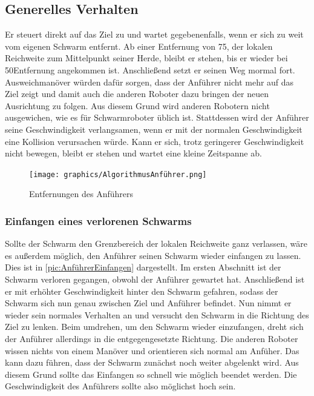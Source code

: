 \subsection*{Generelles Verhalten}

Er steuert direkt auf das Ziel zu und wartet gegebenenfalls, wenn er sich zu weit vom eigenen Schwarm entfernt. Ab einer Entfernung von 75\per, der lokalen Reichweite zum Mittelpunkt seiner Herde, bleibt er stehen, bis er wieder bei 50\per Entfernung angekommen ist. Anschließend setzt er seinen Weg mormal fort. Ausweichmanöver würden dafür sorgen, dass der Anführer nicht mehr auf das Ziel zeigt und damit auch die anderen Roboter dazu bringen der neuen Ausrichtung zu folgen. Aus diesem Grund wird anderen Robotern nicht ausgewichen, wie es für Schwarmroboter üblich ist. Stattdessen wird der Anführer seine Geschwindigkeit verlangsamen, wenn er mit der normalen Geschwindigkeit eine Kollision verursachen würde. Kann er sich, trotz geringerer Geschwindigkeit nicht bewegen, bleibt er stehen und wartet eine kleine Zeitspanne ab.

\begin{figure}
	\texttt{[image: graphics/AlgorithmusAnführer.png]}
	\caption{Entfernungen des Anführers}
	\label{pic:AnführerReichweiten}
\end{figure}

\subsubsection*{Einfangen eines verlorenen Schwarms}\label{subsubsec:AnführerEinfangen}
Sollte der Schwarm den Grenzbereich der lokalen Reichweite ganz verlassen, wäre es außerdem möglich, den Anführer seinen Schwarm wieder einfangen zu lassen. Dies ist in \autoref{pic:AnführerEinfangen} dargestellt.
Im ersten Abschnitt ist der Schwarm verloren gegangen, obwohl der Anführer gewartet hat. Anschließend ist er mit erhöhter Geschwindigkeit hinter den Schwarm gefahren, sodass der Schwarm sich nun genau zwischen Ziel und Anführer befindet. Nun nimmt er wieder sein normales Verhalten an und versucht den Schwarm in die Richtung des Ziel zu lenken. Beim umdrehen, um den Schwarm wieder einzufangen, dreht sich der Anführer allerdings in die entgegengesetzte Richtung. Die anderen Roboter wissen nichts von einem Manöver und orientieren sich normal am Anfüher. Das kann dazu führen, dass der Schwarm zunächst noch weiter abgelenkt wird. Aus diesem Grund sollte das Einfangen so schnell wie möglich beendet werden. Die Geschwindigkeit des Anführers sollte also möglichst hoch sein.

